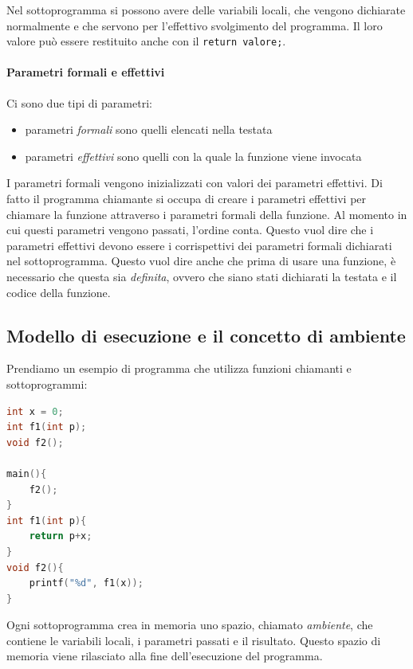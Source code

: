 \documentclass[
  paper=a4,
  oneside  ,captions=tableheading
]{scrbook}
\newcommand{\passthrough}[1]{#1}
\providecommand{\tightlist}{%
  \setlength{\itemsep}{0pt}\setlength{\parskip}{0pt}}
\begin{document}
Nel sottoprogramma si possono avere delle variabili locali, che vengono
dichiarate normalmente e che servono per l'effettivo svolgimento del
programma. Il loro valore può essere restituito anche con il
\passthrough{\lstinline!return valore;!}.

\hypertarget{parametri-formali-e-effettivi}{%
\paragraph{Parametri formali e
effettivi}\label{parametri-formali-e-effettivi}}

Ci sono due tipi di parametri:

\begin{itemize}
\tightlist
\item
  parametri \emph{formali} sono quelli elencati nella testata
\item
  parametri \emph{effettivi} sono quelli con la quale la funzione viene
  invocata
\end{itemize}

I parametri formali vengono inizializzati con valori dei parametri
effettivi. Di fatto il programma chiamante si occupa di creare i
parametri effettivi per chiamare la funzione attraverso i parametri
formali della funzione. Al momento in cui questi parametri vengono
passati, l'ordine conta. Questo vuol dire che i parametri effettivi
devono essere i corrispettivi dei parametri formali dichiarati nel
sottoprogramma. Questo vuol dire anche che prima di usare una funzione,
è necessario che questa sia \emph{definita}, ovvero che siano stati
dichiarati la testata e il codice della funzione.

\hypertarget{modello-di-esecuzione-e-il-concetto-di-ambiente}{%
\subsection{Modello di esecuzione e il concetto di
ambiente}\label{modello-di-esecuzione-e-il-concetto-di-ambiente}}

Prendiamo un esempio di programma che utilizza funzioni chiamanti e
sottoprogrammi:

\begin{lstlisting}[language=C]
int x = 0;
int f1(int p);
void f2();

main(){
    f2();
}
int f1(int p){
    return p+x;
}
void f2(){
    printf("%d", f1(x));
}
\end{lstlisting}

Ogni sottoprogramma crea in memoria uno spazio, chiamato
\emph{ambiente}, che contiene le variabili locali, i parametri passati e
il risultato. Questo spazio di memoria viene rilasciato alla fine
dell'esecuzione del programma.
\end{document}
